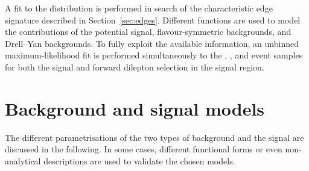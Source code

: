 \label{sec:fit}
A fit to the \mll distribution is performed in search of the characteristic edge signature described in Section~\ref{sec:edges}. Different functions are used to model the contributions of the potential signal, flavour-symmetric backgrounds, and Drell--Yan backgrounds. To fully exploit the available information, an unbinned maximum-likelihood fit is performed simultaneously to the \EE, \MM, and \EM event samples for both the signal and forward dilepton selection in the signal region.

\section{Background and signal models}
The different parametrisations of the two types of background and the signal are discussed in the following. In some cases, different functional forms or even non-analytical descriptions are used to validate the chosen models. 

